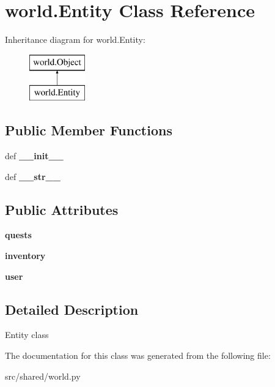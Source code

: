\hypertarget{classworld_1_1_entity}{\section{world.\-Entity \-Class \-Reference}
\label{classworld_1_1_entity}
}
\-Inheritance diagram for world.\-Entity\-:\begin{figure}[H]
\begin{center}
\leavevmode
\includegraphics[height=2.000000cm]{classworld_1_1_entity}
\end{center}
\end{figure}
\subsection*{\-Public \-Member \-Functions}
\begin{DoxyCompactItemize}
\item 
\hypertarget{classworld_1_1_entity_ae3f6c9349b4756df29e482ae07582ca4}{def {\bfseries \-\_\-\-\_\-init\-\_\-\-\_\-}}\label{classworld_1_1_entity_ae3f6c9349b4756df29e482ae07582ca4}

\item 
\hypertarget{classworld_1_1_entity_a7c65fd2ccff136f383bed2d20a9043fd}{def {\bfseries \-\_\-\-\_\-str\-\_\-\-\_\-}}\label{classworld_1_1_entity_a7c65fd2ccff136f383bed2d20a9043fd}

\end{DoxyCompactItemize}
\subsection*{\-Public \-Attributes}
\begin{DoxyCompactItemize}
\item 
\hypertarget{classworld_1_1_entity_a02ac854a6a124cc8bfdef46ae7941434}{{\bfseries quests}}\label{classworld_1_1_entity_a02ac854a6a124cc8bfdef46ae7941434}

\item 
\hypertarget{classworld_1_1_entity_add2bc9bb2f731cc86228d8932a962e60}{{\bfseries inventory}}\label{classworld_1_1_entity_add2bc9bb2f731cc86228d8932a962e60}

\item 
\hypertarget{classworld_1_1_entity_a2e893d9acd136fa158874582882a3f13}{{\bfseries user}}\label{classworld_1_1_entity_a2e893d9acd136fa158874582882a3f13}

\end{DoxyCompactItemize}


\subsection{\-Detailed \-Description}
\begin{DoxyVerb}Entity class \end{DoxyVerb}
 

\-The documentation for this class was generated from the following file\-:\begin{DoxyCompactItemize}
\item 
src/shared/world.\-py\end{DoxyCompactItemize}
